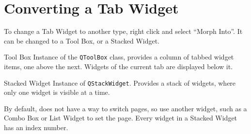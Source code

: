 \documentclass[notes.tex]{subfiles}
\begin{document}
		\section{Converting a Tab Widget}
			To change a Tab Widget to another type, right click and select ``Morph Into''. It can be changed to a Tool Box, or a Stacked Widget.
			\begin{definition}{Tool Box}
				Instance of the \verb|QToolBox| class, provides a column of tabbed widget items, one above the next. Widgets of the current tab are displayed below it.
			\end{definition}
			\begin{definition}{Stacked Widget}
				Instance of \verb|QStackWidget|. Provides a stack of widgets, where only one widget is visible at a time.

				By default, does not have a way to switch pages, so use another widget, such as a Combo Box or List Widget to set the page. Every widget in a Stacked Widget has an index number.
			\end{definition}

\end{document}
